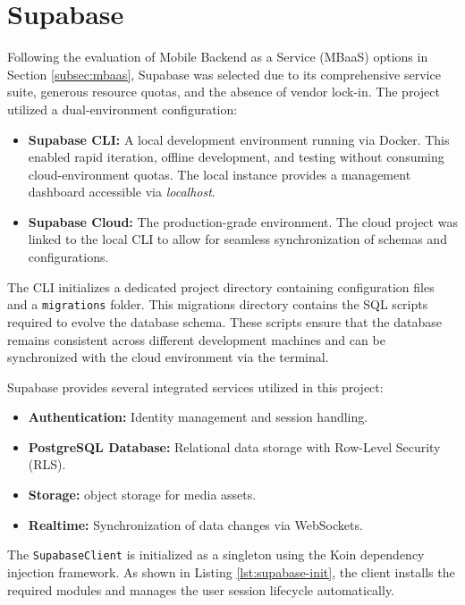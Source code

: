 \section{Supabase}
\label{sec:arch-supabase}

Following the evaluation of Mobile Backend as a Service (MBaaS) options in Section \ref{subsec:mbaas}, Supabase was selected due to its comprehensive service suite, generous resource quotas, and the absence of vendor lock-in. The project utilized a dual-environment configuration:

\begin{itemize}
	\item \textbf{Supabase CLI:} A local development environment running via Docker. This enabled rapid iteration, offline development, and testing without consuming cloud-environment quotas. The local instance provides a management dashboard accessible via \textit{localhost}.
	\item \textbf{Supabase Cloud:} The production-grade environment. The cloud project was linked to the local CLI to allow for seamless synchronization of schemas and configurations.
\end{itemize}

The CLI initializes a dedicated project directory containing configuration files and a \texttt{migrations} folder. This migrations directory contains the SQL scripts required to evolve the database schema. These scripts ensure that the database remains consistent across different development machines and can be synchronized with the cloud environment via the terminal.

Supabase provides several integrated services utilized in this project:
\begin{itemize}
	\item \textbf{Authentication:} Identity management and session handling.
	\item \textbf{PostgreSQL Database:} Relational data storage with Row-Level Security (RLS).
	\item \textbf{Storage:} object storage for media assets.
	\item \textbf{Realtime:} Synchronization of data changes via WebSockets.
\end{itemize}

The \texttt{SupabaseClient} is initialized as a singleton using the Koin dependency injection framework. As shown in Listing \ref{lst:supabase-init}, the client installs the required modules and manages the user session lifecycle automatically.

